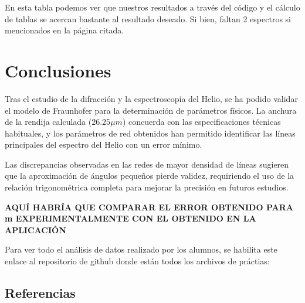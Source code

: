 \documentclass[11pt, a4paper, twocolumn]{article}
\begin{document}
En esta tabla podemos ver que nuestros resultados a través del código y el cálculo de tablas se acercan bastante al resultado deseado. Si bien, faltan 2 espectros
si mencionados en la página citada.

\section{Conclusiones}

Tras el estudio de la difracción y la espectroscopía del Helio, se ha podido validar el modelo de Fraunhofer para la determinación de parámetros físicos. La anchura de la rendija calculada ($26.25 \mu m$) concuerda con las especificaciones técnicas habituales, y los parámetros de red obtenidos han permitido identificar las líneas principales del espectro del Helio con un error mínimo.

\vspace{0.5cm}
Las discrepancias observadas en las redes de mayor densidad de líneas sugieren que la aproximación de ángulos pequeños pierde validez, requiriendo el uso de la relación trigonométrica completa para mejorar la precisión en futuros estudios.

\textbf{AQUÍ HABRÍA QUE COMPARAR EL ERROR OBTENIDO PARA m EXPERIMENTALMENTE CON EL OBTENIDO EN LA APLICACIÓN}

\vspace{1cm}
Para ver todo el análisis de datos realizado por los alumnos, se habilita este enlace al repositorio de github donde están todos los archivos de práctias: 

\subsection{Referencias}

\end{document}
